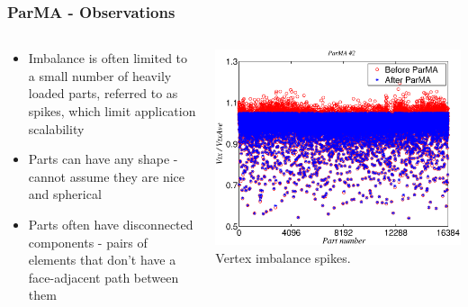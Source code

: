 \documentclass{beamer}
\begin{document}
\begin{frame}
  \frametitle{ParMA - Observations}
  \begin{columns}
    \begin{column}{.48\textwidth}
      \begin{itemize}
        \item Imbalance is often limited to a small number of heavily loaded
          parts, referred to as spikes, which limit application scalability
        \item Parts can have any shape - cannot assume they are nice and spherical
        \item Parts often have disconnected components - pairs of elements
          that don't have a face-adjacent path between them
      \end{itemize}
    \end{column}
    \begin{column}{.5\textwidth}
      \centering
      \includegraphics[width=\textwidth] {figs/numVtx16k_ver.eps}\\
      \small
      Vertex imbalance spikes.
    \end{column}
  \end{columns}
\end{frame}
\end{document}
